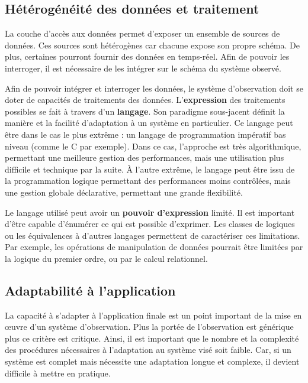 \subsection{Hétérogénéité des données et traitement}
La couche d'accès aux données permet d'exposer un ensemble de sources de données. Ces sources sont hétérogènes car chacune expose son propre schéma. De plus, certaines pourront fournir des données en temps-réel. Afin de pouvoir les interroger, il est nécessaire de les intégrer sur le schéma du système observé.

Afin de pouvoir intégrer et interroger les données, le système d'observation doit se doter de capacités de traitements des données. L'\textbf{expression} des traitements possibles se fait à travers d'un \textbf{langage}. Son paradigme sous-jacent définit la manière et la facilité d'adaptation à un système en particulier. Ce langage peut être dans le cas le plus extrême : un langage de programmation impératif bas niveau (comme le C par exemple). Dans ce cas, l'approche est très algorithmique, permettant une meilleure gestion des performances, mais une utilisation plus difficile et technique par la suite. À l'autre extrême, le langage peut être issu de la programmation logique permettant des performances moins contrôlées, mais une gestion globale déclarative, permettant une grande flexibilité.

Le langage utilisé peut avoir un \textbf{pouvoir d'expression} limité. Il est important d'être capable d'énumérer ce qui est possible d'exprimer. Les classes de logiques ou les équivalences à d'autres langages permettent de caractériser ces limitations. Par exemple, les opérations de manipulation de données pourrait être limitées par la logique du premier ordre, ou par le calcul relationnel.

\subsection{Adaptabilité à l'application}
La capacité à s'adapter à l'application finale est un point important de la mise en œuvre d'un système d'observation. Plus la portée de l'observation est générique plus ce critère est critique. Ainsi, il est important que le nombre et la complexité des procédures nécessaires à l'adaptation au système visé soit faible. Car, si un système est complet mais nécessite une adaptation longue et complexe, il devient difficile à mettre en pratique.

